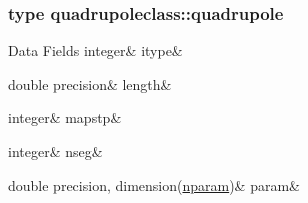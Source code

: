 \subsubsection{type quadrupoleclass\+::quadrupole}
\begin{DoxyFields}{Data Fields}
\mbox{\label{namespacequadrupoleclass_addaf50b0cff1aec9fc452925c7819bdb}} 
integer&
itype&
\\
\hline

\mbox{\label{namespacequadrupoleclass_ac84e0debf991be5cd71ee964781dd7af}} 
double precision&
length&
\\
\hline

\mbox{\label{namespacequadrupoleclass_a283a967adb1fb9dd7c742b5ce97ef3a0}} 
integer&
mapstp&
\\
\hline

\mbox{\label{namespacequadrupoleclass_afece7d333f73554720932318f413f11b}} 
integer&
nseg&
\\
\hline

\mbox{\label{namespacequadrupoleclass_ab9bcd11b6a6e1b6d7242eb243029393f}} 
double precision, dimension(\mbox{\hyperlink{namespacequadrupoleclass_a8eba81bd9796e431c21d0f46260b0c6c}{nparam}})&
param&
\\
\hline

\end{DoxyFields}
